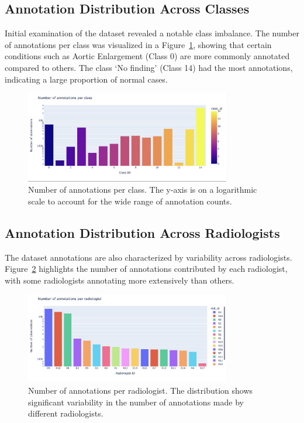 \documentclass[12pt,oneside]{book} %
\begin{document}
\subsection{Annotation Distribution Across Classes}
Initial examination of the dataset revealed a notable class imbalance. The
number of annotations per class was visualized in a
Figure~\ref{fig:annotations_per_class}, showing that certain conditions such as
Aortic Enlargement (Class 0) are more commonly annotated compared to others.
The class `No finding' (Class 14) had the most annotations, indicating a large
proportion of normal cases.

\begin{figure}[H]
    \centering
    \includegraphics[width=0.8\textwidth]{../results/annotations_per_class.png}
    \caption{Number of annotations per class. The y-axis is on a logarithmic scale to account for the wide range of annotation counts.}
    \label{fig:annotations_per_class}
\end{figure}

\subsection{Annotation Distribution Across Radiologists}
The dataset annotations are also characterized by variability across
radiologists. Figure~\ref{fig:annotations_per_rad} highlights the number of
annotations contributed by each radiologist, with some radiologists annotating
more extensively than others.

\begin{figure}[H]
    \centering
    \includegraphics[width=0.8\textwidth]{../results/annotations_per_rad.png}
    \caption{Number of annotations per radiologist. The distribution shows significant variability in the number of annotations made by different radiologists.}
    \label{fig:annotations_per_rad}
\end{figure}
\end{document}
